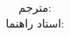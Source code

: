 \title{
    \center
    \textbf{\Huge \CourseName}
}

\author{
    \LARGE
    مترجم:
    \textbf{\Translator} \\[20pt]
    استاد راهنما:
    \textbf{\Instructor} \\[20pt]
}

\date{ \Large
    \Semester
}
